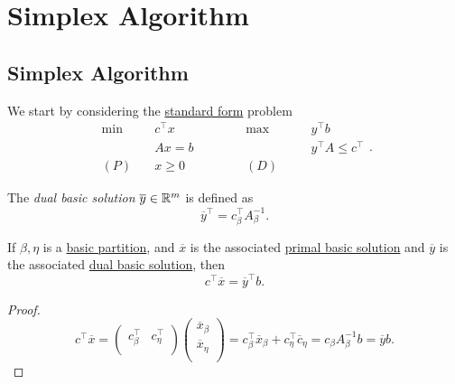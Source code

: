 \chapter{Simplex Algorithm}
\section{Simplex Algorithm}
We start by considering the \hyperref[def:standard-form]{standard form} problem
\[
	\begin{alignedat}{5}
		\min~&c^{\top}x\qquad\qquad &&\max ~ &&y^{\top}b\\
		&Ax = b && &&y^{\top}A\leq c^{\top}\\
		(P)\quad&x\geq  0 &&(D)\quad&&
	\end{alignedat}.
\]

\begin{definition}\label{def:dual-basic-solution}
	The \emph{dual basic solution} \(\overline{y}\in \mathbb{\MakeUppercase{R}}^m\) is defined as
	\[
		\overline{y}^{\top} = c_{\beta}^{\top} A^{-1}_{\beta}.
	\]
\end{definition}

\begin{lemma}\label{lma:lec7-1}
	If \(\beta, \eta\) is a \hyperref[def:basic-partition]{basic partition}, and \(\overline{x}\) is the associated \hyperref[def:basic-solution]{primal basic solution}
	and \(\overline{y}\) is the associated \hyperref[def:dual-basic-solution]{dual basic solution}, then
	\[
		c^{\top}\overline{x} = \overline{y}^{\top} b.
	\]
\end{lemma}
\begin{proof}
	\[
		c^{\top}\overline{x} = \begin{pmatrix}
			c^{\top}_{\beta} & c^{\top}_{\eta} \\
		\end{pmatrix}\begin{pmatrix}
			\overline{x}_{\beta} \\
			\overline{x}_{\eta}  \\
		\end{pmatrix}= c_{\beta}^{\top} \overline{x}_{\beta}+ c_{\eta}^{\top} \overline{c}_{\eta} = c_{\beta} A^{-1}_{\beta}b = \overline{y}b.
	\]
\end{proof}

